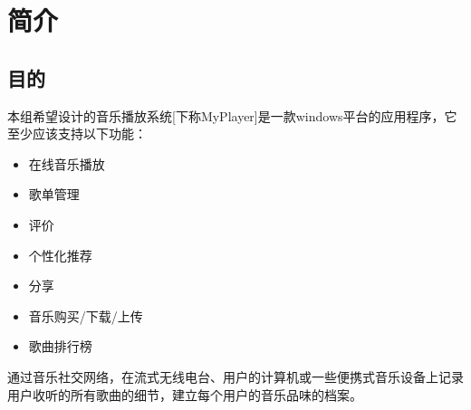 \chapter{简介}
\section{目的}
\iffalse
This section should state the purpose of the document. It could also specify the intended audience. Identify the product whose software requirements are specified in this document.

这部分要描述文档的目的。应该指明读者。说明本需求文档描述了哪个产品的软件需求。
\fi
本组希望设计的音乐播放系统[下称MyPlayer]是一款windows平台的应用程序，它至少应该支持以下功能：
\begin{itemize}
 \item   在线音乐播放
 \item   歌单管理
 \item   评价
 \item   个性化推荐
 \item   分享
 \item   音乐购买/下载/上传
 \item   歌曲排行榜
\end{itemize}
通过音乐社交网络，在流式无线电台、用户的计算机或一些便携式音乐设备上记录用户收听的所有歌曲的细节，建立每个用户的音乐品味的档案。


